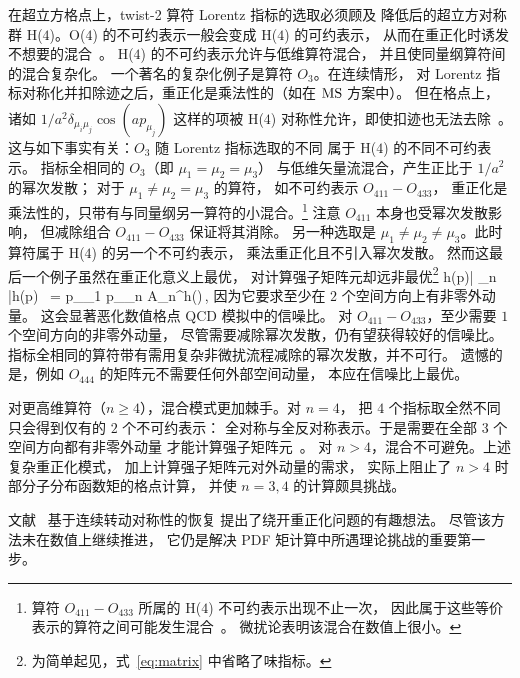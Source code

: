 在超立方格点上，twist-2 算符 Lorentz 指标的选取必须顾及
降低后的超立方对称群 H($4$)。O($4$) 的不可约表示一般会变成 H($4$) 的可约表示，
从而在重正化时诱发不想要的混合~\cite{Kronfeld:1984zv,Martinelli:1987zd,Beccarini:1995iv,Gockeler:1996mu}。
H($4$) 的不可约表示允许与低维算符混合，
并且使同量纲算符间的混合复杂化。
一个著名的复杂化例子是算符 $O_3$。在连续情形，
对 Lorentz 指标对称化并扣除迹之后，重正化是乘法性的（如在 $\text{MS}$ 方案中）。
但在格点上，诸如 $1/a^2 \delta_{\mu_i \mu_j} \cos( a p_{\mu_j})$
这样的项被 H($4$) 对称性允许，即使扣迹也无法去除~\cite{Kronfeld:1984zv}。
这与如下事实有关：$O_3$ 随 Lorentz 指标选取的不同
属于 H($4$) 的不同不可约表示。
指标全相同的 $O_3$（即 $\mu_1 = \mu_2 = \mu_3$）
与低维矢量流混合，产生正比于 $1/a^2$ 的幂次发散；
对于 $\mu_1 \neq \mu_2 = \mu_3$ 的算符，
如不可约表示 $O_{411} - O_{433}$，
重正化是乘法性的，只带有与同量纲另一算符的小混合。\footnote{
    算符 $O_{411} - O_{433}$ 所属的 H($4$) 不可约表示出现不止一次，
    因此属于这些等价表示的算符之间可能发生混合~\cite{Beccarini:1995iv}。
    微扰论表明该混合在数值上很小。
}
注意 $O_{411}$ 本身也受幂次发散影响，
但减除组合 $O_{411} - O_{433}$ 保证将其消除。
另一种选取是 $\mu_1 \neq \mu_2 \neq \mu_3$。此时算符属于 H($4$) 的另一个不可约表示，
乘法重正化且不引入幂次发散。
然而这最后一个例子虽然在重正化意义上最优，
对计算强子矩阵元却远非最优\footnote{为简单起见，式~\eqref{eq:matrix} 中省略了味指标。}
\be
\left \langle h(p)| _n |h(p) \right\rangle\ =
p_{\mu_1} \cdots p_{\mu_n} A_n^{h}(\mu)\,,
\label{eq:matrix}
\ee
因为它要求至少在 $2$ 个空间方向上有非零外动量。
这会显著恶化数值格点 QCD 模拟中的信噪比。
对 $O_{411} - O_{433}$，至少需要 $1$ 个空间方向的非零外动量，
尽管需要减除幂次发散，仍有望获得较好的信噪比。
指标全相同的算符带有需用复杂非微扰流程减除的幂次发散，并不可行。
遗憾的是，例如 $O_{444}$ 的矩阵元不需要任何外部空间动量，
本应在信噪比上最优。

对更高维算符（$n \ge 4$），混合模式更加棘手。对 $n=4$，
把 $4$ 个指标取全然不同只会得到仅有的 $2$ 个不可约表示：
全对称与全反对称表示。于是需要在全部 $3$ 个空间方向都有非零外动量
才能计算强子矩阵元~\cite{Beccarini:1995iv}。
对 $n > 4$，混合不可避免。上述复杂重正化模式，
加上计算强子矩阵元对外动量的需求，
实际上阻止了 $n>4$ 时部分子分布函数矩的格点计算，
并使 $n=3,4$ 的计算颇具挑战。

文献~\cite{Davoudi:2012ya} 基于连续转动对称性的恢复
提出了绕开重正化问题的有趣想法。
尽管该方法未在数值上继续推进，
它仍是解决 PDF 矩计算中所遇理论挑战的重要第一步。
